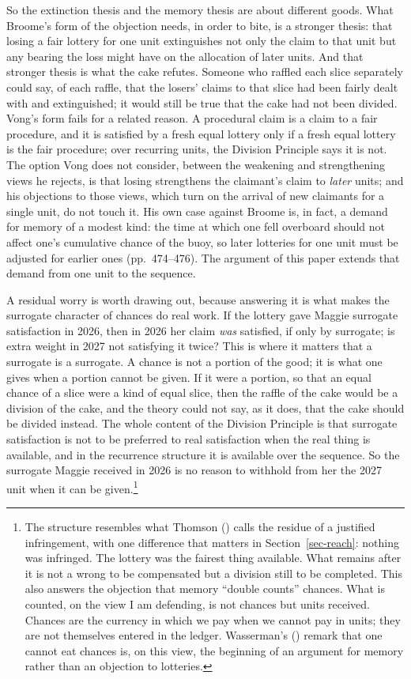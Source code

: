 \documentclass[
  11pt,
  letterpaper,
  DIV=11,
  numbers=noendperiod,
  twoside]{scrartcl}
\begin{document}
So the extinction thesis and the memory thesis are about different
goods. What Broome's form of the objection needs, in order to bite, is a
stronger thesis: that losing a fair lottery for one unit extinguishes
not only the claim to that unit but any bearing the loss might have on
the allocation of later units. And that stronger thesis is what the cake
refutes. Someone who raffled each slice separately could say, of each
raffle, that the losers' claims to that slice had been fairly dealt with
and extinguished; it would still be true that the cake had not been
divided. Vong's form fails for a related reason. A procedural claim is a
claim to a fair procedure, and it is satisfied by a fresh equal lottery
only if a fresh equal lottery is the fair procedure; over recurring
units, the Division Principle says it is not. The option Vong does not
consider, between the weakening and strengthening views he rejects, is
that losing strengthens the claimant's claim to \emph{later} units; and
his objections to those views, which turn on the arrival of new
claimants for a single unit, do not touch it. His own case against
Broome is, in fact, a demand for memory of a modest kind: the time at
which one fell overboard should not affect one's cumulative chance of
the buoy, so later lotteries for one unit must be adjusted for earlier
ones (pp.~474--476). The argument of this paper extends that demand from
one unit to the sequence.

A residual worry is worth drawing out, because answering it is what
makes the surrogate character of chances do real work. If the lottery
gave Maggie surrogate satisfaction in 2026, then in 2026 her claim
\emph{was} satisfied, if only by surrogate; is extra weight in 2027 not
satisfying it twice? This is where it matters that a surrogate is a
surrogate. A chance is not a portion of the good; it is what one gives
when a portion cannot be given. If it were a portion, so that an equal
chance of a slice were a kind of equal slice, then the raffle of the
cake would be a division of the cake, and the theory could not say, as
it does, that the cake should be divided instead. The whole content of
the Division Principle is that surrogate satisfaction is not to be
preferred to real satisfaction when the real thing is available, and in
the recurrence structure it is available over the sequence. So the
surrogate Maggie received in 2026 is no reason to withhold from her the
2027 unit when it can be given.\footnote{The structure resembles what
  Thomson () calls the residue of a
  justified infringement, with one difference that matters in
  Section~\ref{sec-reach}: nothing was infringed. The lottery was the
  fairest thing available. What remains after it is not a wrong to be
  compensated but a division still to be completed. This also answers
  the objection that memory ``double counts'' chances. What is counted,
  on the view I am defending, is not chances but units received. Chances
  are the currency in which we pay when we cannot pay in units; they are
  not themselves entered in the ledger. Wasserman's
  () remark that one cannot eat
  chances is, on this view, the beginning of an argument for memory
  rather than an objection to lotteries.}
\end{document}
